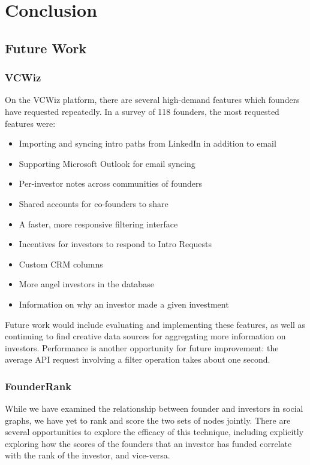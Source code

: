 \chapter{Conclusion}

\section{Future Work}

\subsection{VCWiz}

On the VCWiz platform, there are several high-demand features which founders have requested repeatedly. In a survey of 118 founders, the most requested features were:

\begin{itemize}
  \item Importing and syncing intro paths from LinkedIn in addition to email
  \item Supporting Microsoft Outlook for email syncing
  \item Per-investor notes across communities of founders
  \item Shared accounts for co-founders to share
  \item A faster, more responsive filtering interface
  \item Incentives for investors to respond to Intro Requests
  \item Custom CRM columns
  \item More angel investors in the database
  \item Information on why an investor made a given investment
\end{itemize}

Future work would include evaluating and implementing these features, as well as continuing to find creative data sources for aggregating more information on investors. Performance is another opportunity for future improvement: the average API request involving a filter operation takes about one second.

\subsection{FounderRank}

While we have examined the relationship between founder and investors in social graphs, we have yet to rank and score the two sets of nodes jointly. There are several opportunities to explore the efficacy of this technique, including explicitly exploring how the scores of the founders that an investor has funded correlate with the rank of the investor, and vice-versa.

